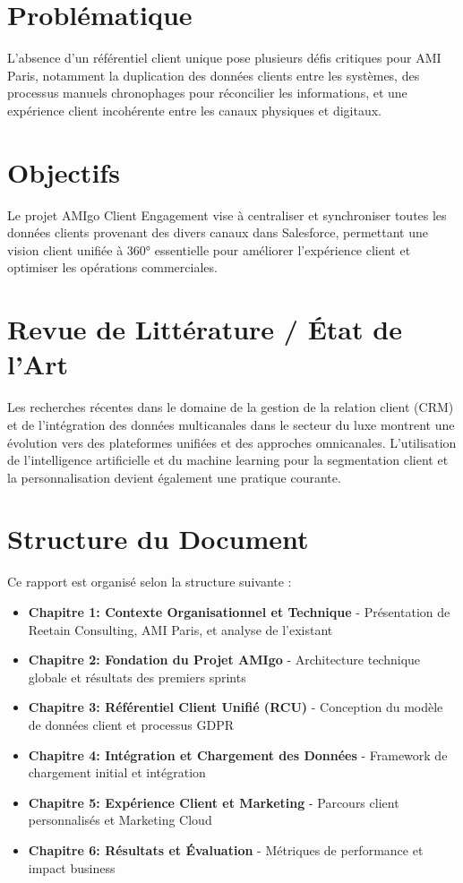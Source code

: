 \documentclass[12pt,a4paper]{report}
\begin{document}
\section{Problématique}
\begin{mdframed}[backgroundcolor=lightgreen!20, linewidth=1pt]
L'absence d'un référentiel client unique pose plusieurs défis critiques pour AMI Paris, notamment la duplication des données clients entre les systèmes, des processus manuels chronophages pour réconcilier les informations, et une expérience client incohérente entre les canaux physiques et digitaux.
\end{mdframed}

\section{Objectifs}
Le projet AMIgo Client Engagement vise à centraliser et synchroniser toutes les données clients provenant des divers canaux dans Salesforce, permettant une vision client unifiée à 360° essentielle pour améliorer l'expérience client et optimiser les opérations commerciales.

\section{Revue de Littérature / État de l'Art}
Les recherches récentes dans le domaine de la gestion de la relation client (CRM) et de l'intégration des données multicanales dans le secteur du luxe montrent une évolution vers des plateformes unifiées et des approches omnicanales. L'utilisation de l'intelligence artificielle et du machine learning pour la segmentation client et la personnalisation devient également une pratique courante.

\section{Structure du Document}
Ce rapport est organisé selon la structure suivante :
\begin{itemize}
    \item \textbf{Chapitre 1: Contexte Organisationnel et Technique} - Présentation de Reetain Consulting, AMI Paris, et analyse de l'existant
    \item \textbf{Chapitre 2: Fondation du Projet AMIgo} - Architecture technique globale et résultats des premiers sprints
    \item \textbf{Chapitre 3: Référentiel Client Unifié (RCU)} - Conception du modèle de données client et processus GDPR
    \item \textbf{Chapitre 4: Intégration et Chargement des Données} - Framework de chargement initial et intégration
    \item \textbf{Chapitre 5: Expérience Client et Marketing} - Parcours client personnalisés et Marketing Cloud
    \item \textbf{Chapitre 6: Résultats et Évaluation} - Métriques de performance et impact business
\end{itemize}
\end{document}

